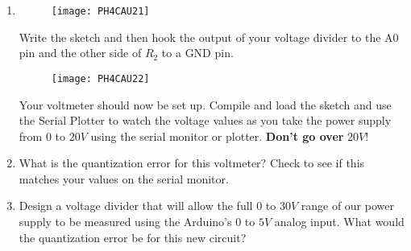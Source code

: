 \begin{enumerate}
\begin{enumerate}
\item \begin{figure}[h!]
\texttt{[image: PH4CAU21]}
\end{figure}Write the sketch and then hook
the output of your voltage divider to the A0 pin and the other side of $%
R_{2} $ to a GND pin.\begin{figure}[h!]
\texttt{[image: PH4CAU22]}
\end{figure}Your voltmeter should now be set
up. Compile and load the sketch and use the Serial Plotter to watch the
voltage values as you take the power supply from $0$ to $20\unit{V}$ using
the serial monitor or plotter. \textbf{Don't go over }$20\unit{V}!$

\item What is the quantization error for this voltmeter? Check to see if
this matches your values on the serial monitor.

\item Design a voltage divider that will allow the full $0$ to $30\unit{V}$
range of our power supply to be measured using the Arduino's $0$ to $5\unit{V%
}$ analog input. What would the quantization error be for this new circuit?
\end{enumerate}
\end{enumerate}